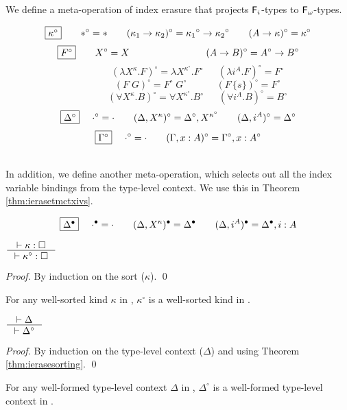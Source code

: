 We define a meta-operation of index erasure that projects $\mathsf{F}_i$-types
to $\mathsf{F}_\omega$-types.
\begin{definition}\label{def:ierase}
\[ \fbox{$\kappa^\circ$}
 ~~~~ ~~
 *^\circ =
 *
 ~~~~ ~~
 (\kappa_1 -> \kappa_2)^\circ =
 {\kappa_1}^\circ -> {\kappa_2}^\circ
 ~~~~ ~~
 (A -> \kappa)^\circ =
 \kappa^\circ
\]
\[ \fbox{$F^\circ$}
 ~~~~ ~~
 X^\circ =
 X
 ~~~~ ~~~~ ~~~~ ~~~~ ~~~~ ~~~~
 (A -> B)^\circ =
 A^\circ -> B^\circ
\]
\[ \qquad \qquad
 (\lambda X^\kappa.F)^\circ =
 \lambda X^{\kappa^\circ}.F^\circ
 ~~~~ ~~~
 (\lambda i^A.F)^\circ =
 F^\circ
\]
\[ \qquad \qquad
 (F\;G)^\circ =
 F^\circ\;G^\circ
 ~~~~ ~~~~ ~~~~ ~~
 (F\,\{s\})^\circ =
 F^\circ
\]
\[ \qquad \qquad
 (\forall X^\kappa . B)^\circ =
 \forall X^{\kappa^\circ} . B^\circ
 ~~~~ ~~~
 (\forall i^A . B)^\circ =
 B^\circ
\]
\[ \fbox{$\Delta^\circ$}
 ~~~~
 \cdot^\circ = \cdot
 ~~~~ ~~
 (\Delta,X^\kappa)^\circ = \Delta^\circ,X^{\kappa^\circ}
 ~~~~ ~~
 (\Delta,i^A)^\circ = \Delta^\circ
\]
\[ \fbox{$\Gamma^\circ$}
 ~~~~
 \cdot^\circ = \cdot
 ~~~~ ~~
 (\Gamma,x:A)^\circ = \Gamma^\circ,x:A^\circ
\]
\end{definition}~\\
In addition, we define another meta-operation, which selects out
all the index variable bindings from the type-level context.
We use this in Theorem \ref{thm:ierasetmctxivs}.
\begin{definition}
        \[ \fbox{$\Delta^\bullet$} ~~~~ \cdot^\bullet = \cdot \qquad
        (\Delta,X^\kappa)^\bullet = \Delta^\bullet \qquad
        (\Delta,i^A)^\bullet = \Delta^\bullet,i:A
\]
\end{definition}



\begin{theorem}
\label{thm:ierasesorting}
        $\inference{|- \kappa : \square}{|- \kappa^\circ : \square}$
\end{theorem}
\begin{proof}
        By induction on the sort ($\kappa$).
	\qed
\end{proof}
\begin{remark}
For any well-sorted kind $\kappa$ in \Fi,
$\kappa^\circ$ is a well-sorted kind in \Fw.
\end{remark}

\begin{theorem}
\label{thm:ierasetyctx}
$ \inference{|- \Delta}{|- \Delta^\circ} $
\end{theorem}
\begin{proof}
        By induction on the type-level context ($\Delta$)
        and using Theorem \ref{thm:ierasesorting}.
	\qed
\end{proof}
\begin{remark}
For any well-formed type-level context $\Delta$ in \Fi,
$\Delta^\circ$ is a well-formed type-level context in \Fw.
\end{remark}

